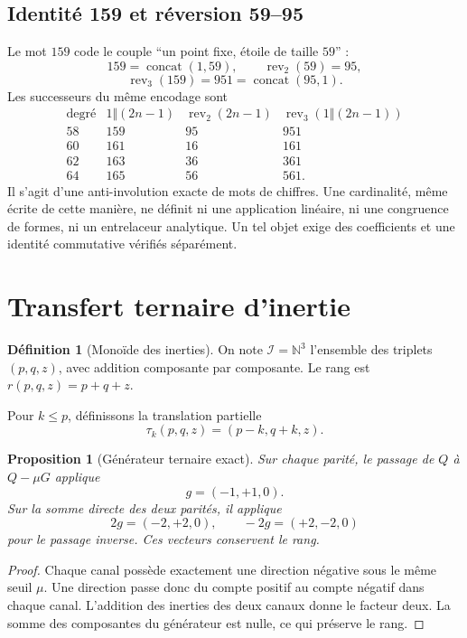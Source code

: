 \documentclass[11pt,a4paper]{article}
\newtheorem{proposition}[theorem]{Proposition}
\theoremstyle{definition}
\newtheorem{definition}[theorem]{Définition}
\newcommand{\Rev}{\operatorname{rev}}
\begin{document}
\subsection{Identité 159 et réversion 59--95}

Le mot $159$ code le couple ``un point fixe, étoile de taille $59$'' :
\[
159=\operatorname{concat}(1,59),\qquad \Rev_2(59)=95,
\]
\[
\boxed{\Rev_3(159)=951=\operatorname{concat}(95,1)}.
\]
Les successeurs du même encodage sont
\[
\begin{array}{c|c|c|c}
\text{degré}&1\Vert(2n-1)&\Rev_2(2n-1)&\Rev_3(1\Vert(2n-1))\\
\hline
58&159&95&951\\
60&161&16&161\\
62&163&36&361\\
64&165&56&561.
\end{array}
\]
Il s'agit d'une anti-involution exacte de mots de chiffres. Une cardinalité, même
écrite de cette manière, ne définit ni une application linéaire, ni une congruence de
formes, ni un entrelaceur analytique. Un tel objet exige des coefficients et une
identité commutative vérifiés séparément.

\section{Transfert ternaire d'inertie}

\begin{definition}[Monoïde des inerties]
On note $\mathcal I=\mathbb N^3$ l'ensemble des triplets $(p,q,z)$, avec addition
composante par composante. Le rang est $r(p,q,z)=p+q+z$.
\end{definition}

Pour $k\le p$, définissons la translation partielle
\[
 \tau_k(p,q,z)=(p-k,q+k,z).
\]

\begin{proposition}[Générateur ternaire exact]
Sur chaque parité, le passage de $Q$ à $Q-\mu G$ applique
\[
 g=(-1,+1,0).
\]
Sur la somme directe des deux parités, il applique
\[
 2g=(-2,+2,0),\qquad -2g=(+2,-2,0)
\]
pour le passage inverse. Ces vecteurs conservent le rang.
\end{proposition}

\begin{proof}
Chaque canal possède exactement une direction négative sous le même seuil $\mu$.
Une direction passe donc du compte positif au compte négatif dans chaque canal.
L'addition des inerties des deux canaux donne le facteur deux. La somme des composantes
du générateur est nulle, ce qui préserve le rang.
\end{proof}
\end{document}
